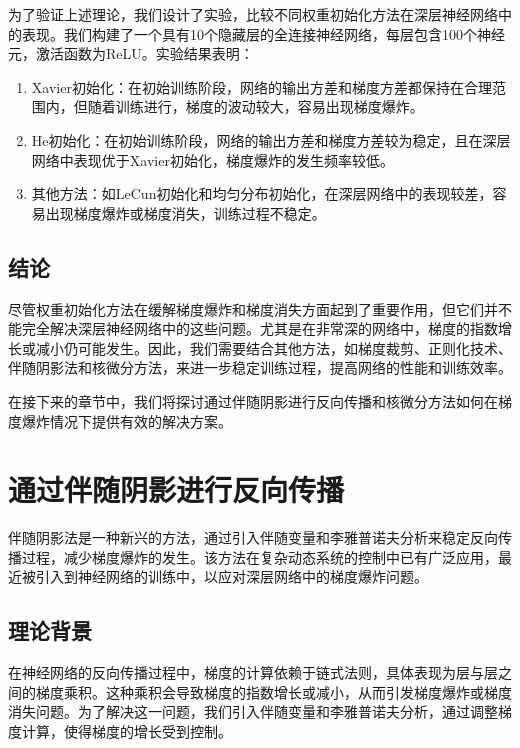为了验证上述理论，我们设计了实验，比较不同权重初始化方法在深层神经网络中的表现。我们构建了一个具有10个隐藏层的全连接神经网络，每层包含100个神经元，激活函数为ReLU。实验结果表明：

\begin{enumerate}

  \item Xavier初始化：在初始训练阶段，网络的输出方差和梯度方差都保持在合理范围内，但随着训练进行，梯度的波动较大，容易出现梯度爆炸。

  \item He初始化：在初始训练阶段，网络的输出方差和梯度方差较为稳定，且在深层网络中表现优于Xavier初始化，梯度爆炸的发生频率较低。

  \item 其他方法：如LeCun初始化和均匀分布初始化，在深层网络中的表现较差，容易出现梯度爆炸或梯度消失，训练过程不稳定。

\end{enumerate}

\subsection{结论}

尽管权重初始化方法在缓解梯度爆炸和梯度消失方面起到了重要作用，但它们并不能完全解决深层神经网络中的这些问题。尤其是在非常深的网络中，梯度的指数增长或减小仍可能发生。因此，我们需要结合其他方法，如梯度裁剪、正则化技术、伴随阴影法和核微分方法，来进一步稳定训练过程，提高网络的性能和训练效率。

在接下来的章节中，我们将探讨通过伴随阴影进行反向传播和核微分方法如何在梯度爆炸情况下提供有效的解决方案。

\section{通过伴随阴影进行反向传播}

伴随阴影法是一种新兴的方法，通过引入伴随变量和李雅普诺夫分析来稳定反向传播过程，减少梯度爆炸的发生。该方法在复杂动态系统的控制中已有广泛应用，最近被引入到神经网络的训练中，以应对深层网络中的梯度爆炸问题。

\subsection{理论背景}

在神经网络的反向传播过程中，梯度的计算依赖于链式法则，具体表现为层与层之间的梯度乘积。这种乘积会导致梯度的指数增长或减小，从而引发梯度爆炸或梯度消失问题。为了解决这一问题，我们引入伴随变量和李雅普诺夫分析，通过调整梯度计算，使得梯度的增长受到控制。

